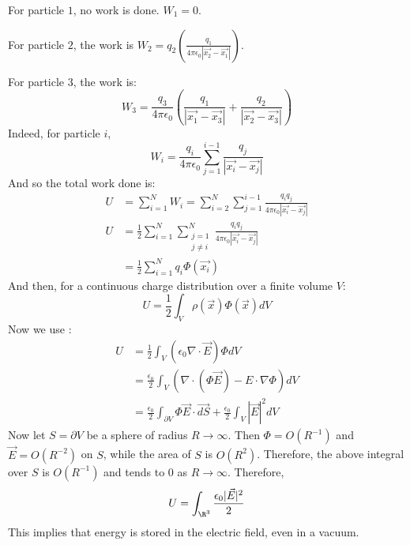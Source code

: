 \documentclass[../Main.tex]{subfiles}
\begin{document}
For particle $1$, no work is done. $W_1 = 0$.

For particle $2$, the work is $W_2 = q_2 \left(\frac{q_1}{4\pi \epsilon_0 |\vec{x_2} - \vec{x_1}|}\right)$.

For particle $3$, the work is:
\begin{equation*}
    W_3 = \frac{q_3}{4\pi \epsilon_0} \left(\frac{q_1}{|\vec{x_1} - \vec{x_3}|} + \frac{q_2}{|\vec{x_2} - \vec{x_3}|}\right)
\end{equation*}
Indeed, for particle $i$,
\begin{equation*}
    W_i = \frac{q_i}{4\pi \epsilon_0}\sum_{j=1}^{i-1} \frac{q_j}{|\vec{x_i} - \vec{x_j}|}
\end{equation*}
And so the total work done is:
\begin{align*}
    U &= \sum_{i=1}^{N} W_i = \sum_{i=2}^{N} \sum_{j=1}^{i-1} \frac{q_i q_j}{4\pi \epsilon_0 |\vec{x_i} - \vec{x_j}|} \\
    U &= \frac12 \sum_{i=1}^{N} \sum_{\substack{j=1\\j \neq i}}^{N} \frac{q_i q_j}{4\pi \epsilon_0 |\vec{x_i} - \vec{x_j}|} \\
    &= \frac12 \sum_{i=1}^{N} q_i \Phi(\vec{x_i})
\end{align*}
And then, for a continuous charge distribution over a finite volume $V$:
\begin{equation}
    U = \frac12 \int_V \rho(\vec{x}) \Phi(\vec{x}) dV
    \label{eqnElectroEnergyDisc}
\end{equation}
Now we use :
\begin{align*}
    U &= \frac12 \int_V (\epsilon_0 \nabla \cdot \vec{E}) \Phi dV \\
    &= \frac{\epsilon_0}{2} \int_V \left(\nabla \cdot (\Phi\vec{E}) - E \cdot \nabla \Phi\right) dV \\
    &= \frac{\epsilon_0}{2} \int_{\partial V} \Phi\vec{E} \cdot \vec{dS} + \frac{\epsilon_0}{2}\int_V |\vec{E}|^2 dV
\end{align*}
Now let $S = \partial V$ be a sphere of radius $R \to \infty$. Then $\Phi = O(R^{-1})$ and $\vec{E} = O(R^{-2})$ on $S$, while the area of $S$ is $O(R^2)$. Therefore, the above integral over $S$ is $O(R^{-1})$ and tends to $0$ as $R \to \infty$.
Therefore,
\begin{equation}
    U = \int_{\R^3} \frac{\epsilon_0 |\vec{E}|^2}{2}
    \label{eqnElectroEnergyCts}
\end{equation}
This implies that energy is stored in the electric field, even in a vacuum. %
\end{document}
